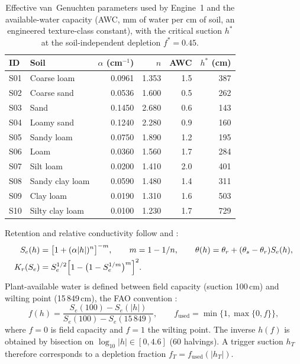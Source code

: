\begin{table}[H]\centering\small
\caption{Effective van~Genuchten parameters used by Engine~1 and the available-water capacity (AWC, mm of water per cm of soil, an engineered texture-class constant), with the critical suction $h^\ast$ at the soil-independent depletion $f^\ast=0.45$.}
\label{tab:soilsP3}
\begin{tabular}{llrrrr}
\toprule
ID & Soil & $\alpha$ (cm$^{-1}$) & $n$ & AWC & $h^\ast$ (cm)\\\midrule
S01 & Coarse loam & 0.0961 & 1.353 & 1.5 & 387\\
S02 & Coarse sand & 0.0536 & 1.600 & 0.5 & 262\\
S03 & Sand & 0.1450 & 2.680 & 0.6 & 143\\
S04 & Loamy sand & 0.1240 & 2.280 & 0.9 & 160\\
S05 & Sandy loam & 0.0750 & 1.890 & 1.2 & 195\\
S06 & Loam & 0.0360 & 1.560 & 1.7 & 284\\
S07 & Silt loam & 0.0200 & 1.410 & 2.0 & 401\\
S08 & Sandy clay loam & 0.0590 & 1.480 & 1.4 & 311\\
S09 & Clay loam & 0.0190 & 1.310 & 1.6 & 503\\
S10 & Silty clay loam & 0.0100 & 1.230 & 1.7 & 729\\\bottomrule
\end{tabular}
\end{table}

Retention and relative conductivity follow \citet{vanGenuchten1980} and \citet{Mualem1976}:
\begin{align}
S_e(h)&=\bigl[1+(\alpha|h|)^{n}\bigr]^{-m},\qquad m=1-1/n,\qquad \theta(h)=\theta_r+(\theta_s-\theta_r)S_e(h),\label{eq:vgP3}\\
K_r(S_e)&=S_e^{1/2}\Bigl[1-\bigl(1-S_e^{1/m}\bigr)^{m}\Bigr]^{2}. \label{eq:mualemP3}
\end{align}
Plant-available water is defined between field capacity (suction 100\,cm) and wilting point (15\,849\,cm), the FAO convention \citep{Allen1998}:
\begin{equation}
f(h)=\frac{S_e(100)-S_e(|h|)}{S_e(100)-S_e(15\,849)},\qquad f_{\mathrm{used}}=\min\{1,\max\{0,f\}\},
\label{eq:depl}
\end{equation}
where $f=0$ is field capacity and $f=1$ the wilting point. The inverse $h(f)$ is obtained by bisection on $\log_{10}|h|\in[0,4.6]$ (60 halvings). A trigger suction $h_T$ therefore corresponds to a depletion fraction $f_T=f_{\mathrm{used}}(|h_T|)$.

